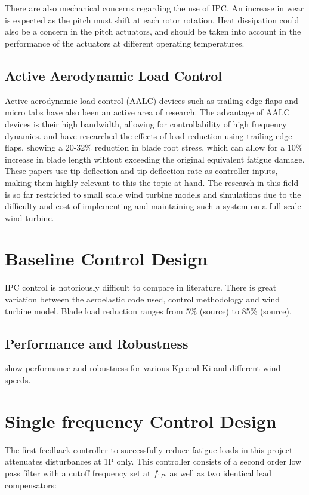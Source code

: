 \\~\\
There are also mechanical concerns regarding the use of IPC. An increase in wear is expected as the pitch must shift at each rotor rotation. Heat dissipation could also be a concern in the pitch actuators, and should be taken into account in the performance of the actuators at different operating temperatures.


\subsection{Active Aerodynamic Load Control}
Active aerodynamic load control (AALC) devices such as trailing edge flaps and micro tabs have also been an active area of research. The advantage of AALC devices is their high bandwidth, allowing for controllability of high frequency dynamics. \citet{7_Berg} and \citet{10_Wilson} have researched the effects of load reduction using trailing edge flaps, showing a 20-32\% reduction in blade root stress, which can allow for a 10\% increase in blade length wihtout exceeding the original equivalent fatigue damage. These papers use tip deflection and tip deflection rate  as controller inputs, making them highly relevant to this the topic at hand. The research in this field is so far restricted to small scale wind turbine models and simulations due to the difficulty and cost of implementing and maintaining such a system on a full scale wind turbine. 





\section{Baseline Control Design}
IPC control is notoriously difficult to compare in literature. There is great variation between the aeroelastic code used, control methodology and wind turbine model. Blade load reduction ranges from 5\% (source) to 85\% (source). 

\subsection{Performance and Robustness}
show performance and robustness for various Kp and Ki and different wind speeds.

\section{Single frequency Control Design}
The first feedback controller to successfully reduce fatigue loads in this project attenuates disturbances at 1P only. This controller consists of a second order low pass filter with a cutoff frequency set at $f_{1P}$, as well as two identical lead compensators:

